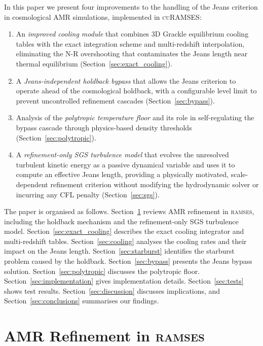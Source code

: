 \documentclass[fleqn,usenatbib]{mnras}
\newcommand{\ramses}{\textsc{ramses}}
\newcommand{\curamses}{\textsc{cuRAMSES}}
\begin{document}
In this paper we present four improvements to the handling of the
Jeans criterion in cosmological AMR simulations, implemented in
\curamses:
\begin{enumerate}
  \item An \emph{improved cooling module} that combines 3D Grackle
    equilibrium cooling tables with the \citet{Townsend2009} exact
    integration scheme and multi-redshift interpolation, eliminating
    the N-R overshooting that contaminates the Jeans length near
    thermal equilibrium (Section~\ref{sec:exact_cooling}).
  \item A \emph{Jeans-independent holdback bypass} that allows the
    Jeans criterion to operate ahead of the cosmological holdback,
    with a configurable level limit to prevent uncontrolled refinement
    cascades (Section~\ref{sec:bypass}).
  \item Analysis of the \emph{polytropic temperature floor} and its
    role in self-regulating the bypass cascade through physics-based
    density thresholds (Section~\ref{sec:polytropic}).
  \item A \emph{refinement-only SGS turbulence model} that evolves
    the unresolved turbulent kinetic energy as a passive dynamical
    variable and uses it to compute an effective Jeans length,
    providing a physically motivated, scale-dependent refinement
    criterion without modifying the hydrodynamic solver or incurring
    any CFL penalty (Section~\ref{sec:sgs}).
\end{enumerate}

The paper is organised as follows.
Section~\ref{sec:amr_refine} reviews AMR refinement in \ramses,
including the holdback mechanism and the refinement-only SGS
turbulence model.
Section~\ref{sec:exact_cooling} describes the exact cooling integrator
and multi-redshift tables.
Section~\ref{sec:cooling} analyses the cooling rates and their impact
on the Jeans length.
Section~\ref{sec:starburst} identifies the starburst problem caused
by the holdback.
Section~\ref{sec:bypass} presents the Jeans bypass solution.
Section~\ref{sec:polytropic} discusses the polytropic floor.
Section~\ref{sec:implementation} gives implementation details.
Section~\ref{sec:tests} shows test results.
Section~\ref{sec:discussion} discusses implications, and
Section~\ref{sec:conclusions} summarises our findings.


\section{AMR Refinement in \ramses}
\label{sec:amr_refine}
\end{document}
